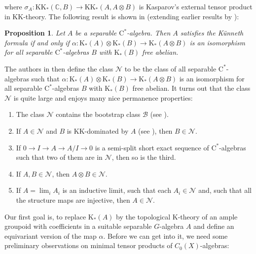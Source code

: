 \documentclass[reqno,oneside,a4paper,11pt]{amsart}
\theoremstyle{theorem}
\newtheorem{prop}[satz]{Proposition}
\theoremstyle{definition}
\newcommand{\KK}{\mathrm{KK}}
\newcommand{\K}{\mathrm K}
\newcommand{\CC}{\mathbb C}
\begin{document}
	where $\sigma_A:\KK_*(\CC,B)\rightarrow \KK_*(A,A\otimes B)$ is Kasparov's external tensor product in $\KK$-theory.
	The following result is shown in \cite[Proposition~4.2]{CEO} (extending earlier results by \cite{MR650021}):
	\begin{prop}
		Let $A$ be a separable $\mathrm{C}^*$-algebra. Then $A$ satisfies the Künneth formula if and only if $\alpha:\K_*(A)\otimes \K_*(B)\rightarrow \K_*(A\otimes B)$ is an isomorphism for all separable $\mathrm{C}^*$-algebras $B$ with $\K_*(B)$ free abelian.
	\end{prop}
	The authors in \cite{CEO} then define the class $\mathcal{N}$ to be the class of all separable $\mathrm{C}^*$-algebras such that $\alpha:\K_*(A)\otimes \K_*(B)\rightarrow \K_*(A\otimes B)$ is an isomorphism for all separable $\mathrm{C}^*$-algebras $B$ with $\K_*(B)$ free abelian. It turns out that the class $\mathcal{N}$ is quite large and enjoys many nice permanence properties:
	\begin{enumerate}
		\item The class $\mathcal{N}$ contains the bootstrap class $\mathcal{B}$ (see \cite[Definition~22.3.4]{MR1656031}).
		\item If $A\in\mathcal{N}$ and $B$ is $\mathrm{KK}$-dominated by $A$ (see \cite[Definition~23.10.6]{MR1656031}), then $B\in\mathcal{N}$.
		\item If $0\rightarrow I\rightarrow A\rightarrow A/I\rightarrow 0$ is a semi-split short exact sequence of $\mathrm{C}^*$-algebras such that two of them are in $\mathcal{N}$, then so is the third.
		\item If $A,B\in\mathcal{N}$, then $A\otimes B\in\mathcal{N}$.
		\item If $A=\lim_i A_i$ is an inductive limit, such that each $A_i\in\mathcal{N}$ and, such that all the structure maps are injective, then $A\in\mathcal{N}$.
	\end{enumerate}
	
	Our first goal is, to replace $\K_*(A)$ by the topological $\K$-theory of an ample groupoid with coefficients in a suitable separable $G$-algebra $A$ and define an equivariant version of the map $\alpha$.
	Before we can get into it, we need some preliminary observations on minimal tensor products of $C_0(X)$-algebras:
	
\end{document}
